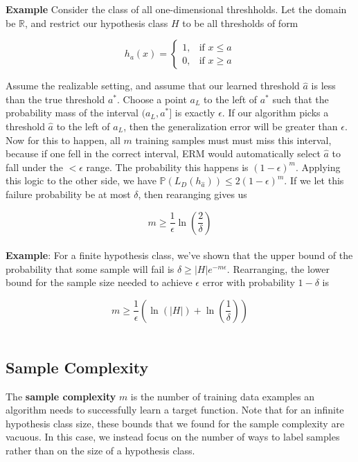 \documentclass[11pt]{article}
\begin{document}
\noindent \textbf{Example} Consider the class of all one-dimensional threshholds. Let the domain be \( \mathbb{R} \), and restrict our hypothesis class \( H \) to be all thresholds of form 

\[ 
    h_{a}(x) =  
    \begin{cases}
        1, &\text{if } x \leq a\\
        0, &\text{if } x \geq a    
    \end{cases}
\]

\noindent Assume the realizable setting, and assume that our learned threshold \( \hat{a} \) is less than the true threshold \( a^{*} \). Choose a point \( a_{L} \) to the left of \( a^{{*}} \) such that
the probability mass of the interval \( (a_{L}, a^{*}] \) is exactly \( \epsilon \). If our algorithm picks a threshold \( \hat{a} \) to the left of \( a_{L} \), then the generalization error will be greater than
\( \epsilon \). Now for this to happen, all \( m \) training samples must  must miss this interval, because if one fell in the correct interval, ERM would automatically select \( \hat{a} \) to fall under the \( < \epsilon \) 
range. The probability this happens is \( (1-\epsilon)^{m} \). Applying this logic to the other side, we have \( \mathbb{P}(L_{D}(h_{\hat{a}})) \leq 2(1-\epsilon)^{m} \). If we let this failure probability be at most 
\( \delta \), then rearanging gives us

\[ 
    m \geq \frac{1}{\epsilon}\ln{\left( \frac{2}{\delta} \right)} 
\]
\\

\noindent \textbf{Example}: For a finite hypothesis class, we've shown that the upper bound of the probability that some sample will fail is 
\( \delta \geq |H|e^{-m\epsilon} \). Rearranging, the lower bound for the sample size needed to achieve \( \epsilon \) error with probability \( 1-\delta \) is 

\[ 
    m \geq \frac{1}{\epsilon}\left(\ln{\left( |H| \right)} + \ln{\left( \frac{1}{\delta} \right)}\right) 
\] 
\\

\subsection{Sample Complexity}

\noindent The \textbf{sample complexity} \( m \) is the number of training data examples an algorithm needs to successfully learn a target function.
Note that for an infinite hypothesis class size, these bounds that we found for the sample complexity are vacuous. In this case, we instead focus on the number of ways to label samples rather than on the size of a hypothesis class. 
\\
\end{document}
